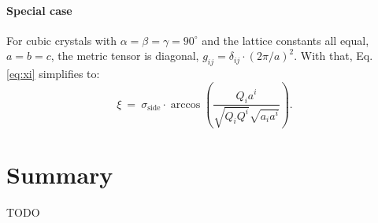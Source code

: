 \paragraph*{Special case}
For cubic crystals with $\alpha = \beta = \gamma = 90^{\circ}$ and the lattice constants all equal, $a = b = c$, the metric tensor is diagonal, $g_{ij} = \delta_{ij} \cdot \left( 2\pi / a \right)^2$.
With that, Eq. \ref{eq:xi} simplifies to:
\begin{equation}
	\xi \ =\  \sigma_{\mathrm{side}} \cdot \arccos \left( \frac{ Q_i a^i }{ \sqrt{Q_i Q^i} \sqrt{a_i a^i} } \right).
\end{equation}


\section{Summary}
TODO
